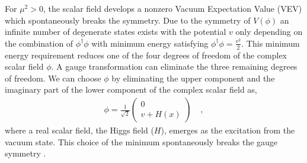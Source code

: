 For $\mu^2 > 0$, the scalar field develops a nonzero Vacuum Expectation Value (VEV) which spontaneously breaks the symmetry. Due to the symmetry of $V(\phi)$ an infinite number of degenerate states exists with the potential $v$ only depending on the combination of $\phi^{\dagger}\phi$ 
\cite{PeskinQFT} with minimum energy satisfying $\phi^{\dagger}\phi = \frac{v^2}{2}$. This minimum energy requirement reduces one of the four degrees of freedom of the complex scalar field $\phi$. A gauge transformation can eliminate the three remaining degrees of freedom. We can choose $\phi$ by eliminating the upper component and the imaginary part of the lower component of the complex scalar field as,
\begin{equation}
\begin{array}{l}
\phi = \frac{1}{\sqrt{2}}\begin{pmatrix} 0 \\ v+H(x) \end{pmatrix}~ \hspace{10pt},
\end{array}
\label{eqn:ScalarExp}
\end{equation}
where a real scalar field, the Higgs field ($H$), emerges as the excitation from the vacuum state. This choice of the minimum spontaneously breaks the gauge symmetry \cite{DESYHiggsLecture}.  

